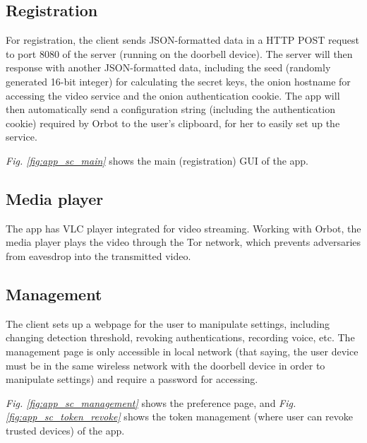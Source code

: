 \subsection{Registration} For registration, the client sends JSON-formatted data in a HTTP POST request to port 8080 of the server (running on the doorbell device). The server will then response with another JSON-formatted data, including the seed (randomly generated 16-bit integer) for calculating the secret keys, the onion hostname for accessing the video service and the onion authentication cookie. The app will then automatically send a configuration string (including the authentication cookie) required by Orbot to the user's clipboard, for her to easily set up the service.

\textit{Fig. \ref{fig:app_sc_main}} shows the main (registration) GUI of the app.


\subsection{Media player} The app has VLC player integrated for video streaming. Working with Orbot, the media player plays the video through the Tor network, which prevents adversaries from eavesdrop into the transmitted video.

\subsection{Management} The client sets up a webpage for the user to manipulate settings, including changing detection threshold, revoking authentications, recording voice, etc. The management page is only accessible in local network (that saying, the user device must be in the same wireless network with the doorbell device in order to manipulate settings) and require a password for accessing.

\textit{Fig. \ref{fig:app_sc_management}} shows the preference page, and \textit{Fig. \ref{fig:app_sc_token_revoke}} shows the token management (where user can revoke trusted devices) of the app.

